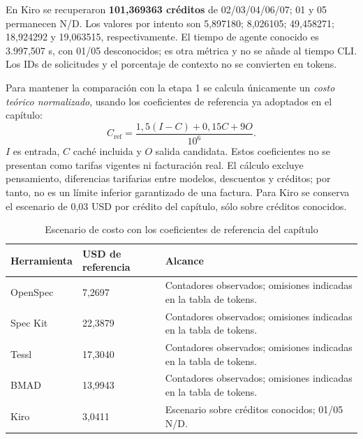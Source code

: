 En Kiro se recuperaron \textbf{101,369363 créditos} de 02/03/04/06/07; 01 y 05 permanecen N/D. Los valores por intento son 5,897180; 8,026105; 49,458271; 18,924292 y 19,063515, respectivamente. El tiempo de agente conocido es 3.997,507 s, con 01/05 desconocidos; es otra métrica y no se añade al tiempo CLI. Los IDs de solicitudes y el porcentaje de contexto no se convierten en tokens.

Para mantener la comparación con la etapa 1 se calcula únicamente un \textit{costo teórico normalizado}, usando los coeficientes de referencia ya adoptados en el capítulo:
\[
 C_{\mathrm{ref}}=\frac{1{,}5(I-C)+0{,}15C+9O}{10^6}.
\]
$I$ es entrada, $C$ caché incluida y $O$ salida candidata. Estos coeficientes no se presentan como tarifas vigentes ni facturación real. El cálculo excluye pensamiento, diferencias tarifarias entre modelos, descuentos y créditos; por tanto, no es un límite inferior garantizado de una factura. Para Kiro se conserva el escenario de 0,03 USD por crédito del capítulo, sólo sobre créditos conocidos.

\begin{table}[H]\centering\small\setlength{\tabcolsep}{4pt}\renewcommand{\arraystretch}{1.06}
\caption{Escenario de costo con los coeficientes de referencia del capítulo}
\label{tab:costo_tetris_e2}
\begin{tabularx}{\textwidth}{l Y Y}\toprule

\textbf{Herramienta} & \textbf{USD de referencia} & \textbf{Alcance} \\ \midrule

OpenSpec & 7,2697 & Contadores observados; omisiones indicadas en la tabla de tokens. \\

Spec Kit & 22,3879 & Contadores observados; omisiones indicadas en la tabla de tokens. \\

Tessl & 17,3040 & Contadores observados; omisiones indicadas en la tabla de tokens. \\

BMAD & 13,9943 & Contadores observados; omisiones indicadas en la tabla de tokens. \\

Kiro & 3,0411 & Escenario sobre créditos conocidos; 01/05 N/D. \\

\bottomrule\end{tabularx}

\end{table}

